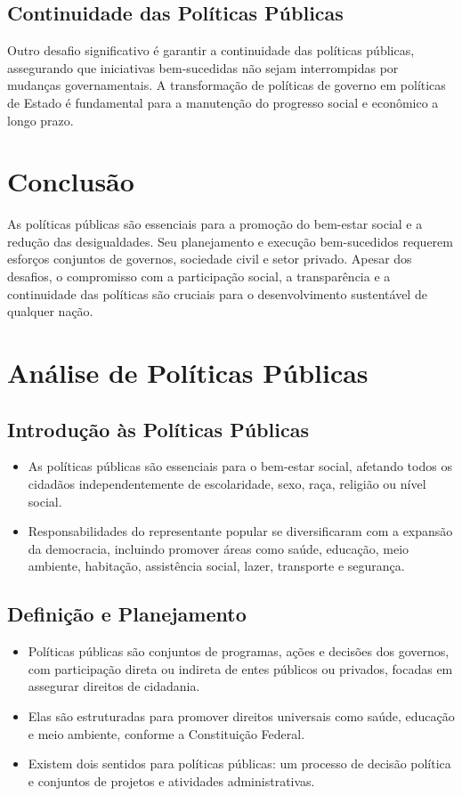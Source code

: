 \documentclass[
   article,       
   12pt,          
   oneside,       
   a4paper,       
   english,       
   brazil,        
   sumario=tradicional
   ]{abntex2}
\begin{document}
\subsection{Continuidade das Políticas Públicas}

Outro desafio significativo é garantir a continuidade das políticas públicas, assegurando que iniciativas bem-sucedidas não sejam interrompidas por mudanças governamentais. A transformação de políticas de governo em políticas de Estado é fundamental para a manutenção do progresso social e econômico a longo prazo.

\section{Conclusão}

As políticas públicas são essenciais para a promoção do bem-estar social e a redução das desigualdades. Seu planejamento e execução bem-sucedidos requerem esforços conjuntos de governos, sociedade civil e setor privado. Apesar dos desafios, o compromisso com a participação social, a transparência e a continuidade das políticas são cruciais para o desenvolvimento sustentável de qualquer nação.
\section{Análise de Políticas Públicas}
\subsection{Introdução às Políticas Públicas}
\begin{itemize}
    \item As políticas públicas são essenciais para o bem-estar social, afetando todos os cidadãos independentemente de escolaridade, sexo, raça, religião ou nível social. 
    \item Responsabilidades do representante popular se diversificaram com a expansão da democracia, incluindo promover áreas como saúde, educação, meio ambiente, habitação, assistência social, lazer, transporte e segurança.
\end{itemize}

\subsection{Definição e Planejamento}
\begin{itemize}
    \item Políticas públicas são conjuntos de programas, ações e decisões dos governos, com participação direta ou indireta de entes públicos ou privados, focadas em assegurar direitos de cidadania.
    \item Elas são estruturadas para promover direitos universais como saúde, educação e meio ambiente, conforme a Constituição Federal.
    \item Existem dois sentidos para políticas públicas: um processo de decisão política e conjuntos de projetos e atividades administrativas.
\end{itemize}
\end{document}
